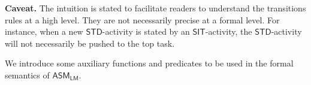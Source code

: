 \documentclass[preprint,12pt]{elsarticle}
\newcommand{\LMAMASS}{\textsf{ASM}_\textsf{LM}}
\newcommand\aname{\mathfrak{n}}
\newcommand{\SIT}{\mathsf{SIT}}
\newcommand{\STD}{\mathsf{STD}}
\newcommand\toptsk{\mathsf{TopTsk}}
\newcommand\topact{\mathsf{Top}}
\newcommand\btmact{\mathsf{Btm}}
\newcommand\push{\mathsf{Push}}
\begin{document}
\noindent\textbf{Caveat.} The intuition is stated to facilitate readers to understand the transitions rules at a high level. They are not necessarily precise at a formal level. For instance, when a new $\STD$-activity is stated by an $\SIT$-activity, the $\STD$-activity will not necessarily be pushed to the top task. 
%

We introduce some auxiliary functions and predicates to be used in the formal semantics of $\LMAMASS$.

	
\end{document}
